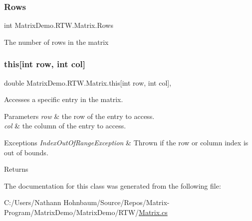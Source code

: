 \subsubsection{\texorpdfstring{Rows}{Rows}}
{\footnotesize\ttfamily int Matrix\+Demo.\+R\+T\+W.\+Matrix.\+Rows\hspace{0.3cm}{\ttfamily [get]}}



The number of rows in the matrix 

\mbox{\label{class_matrix_demo_1_1_r_t_w_1_1_matrix_aa908f44fc8fd669347ba6a4833406f66}} 
\subsubsection{\texorpdfstring{this[int row, int col]}{this[int row, int col]}}
{\footnotesize\ttfamily double Matrix\+Demo.\+R\+T\+W.\+Matrix.\+this\mbox{[}int row, int col\mbox{]}\hspace{0.3cm}{\ttfamily [get]}, {\ttfamily [set]}}



Accesses a specific entry in the matrix. 


\begin{DoxyParams}{Parameters}
{\em row} & the row of the entry to access.\\
\hline
{\em col} & the column of the entry to access.\\
\hline
\end{DoxyParams}

\begin{DoxyExceptions}{Exceptions}
{\em Index\+Out\+Of\+Range\+Exception} & Thrown if the row or column index is out of bounds.\\
\hline
\end{DoxyExceptions}
\begin{DoxyReturn}{Returns}

\end{DoxyReturn}


The documentation for this class was generated from the following file\+:\begin{DoxyCompactItemize}
\item 
C\+:/\+Users/\+Nathann Hohnbaum/\+Source/\+Repos/\+Matrix-\/\+Program/\+Matrix\+Demo/\+Matrix\+Demo/\+R\+T\+W/\mbox{\hyperlink{_matrix_8cs}{Matrix.\+cs}}\end{DoxyCompactItemize}
